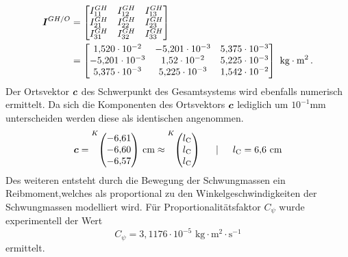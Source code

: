 \begin{equation}
\begin{split}
\boldsymbol{I}^{GH/O} &= \begin{bmatrix}
I^{GH}_{\text{11}} & I^{GH}_{\text{12}} & I^{GH}_{\text{13}} \\
I^{GH}_{\text{21}} & I^{GH}_{\text{22}} & I^{GH}_{\text{23}} \\
I^{GH}_{\text{31}} & I^{GH}_{\text{32}} & I^{GH}_{\text{33}}
\end{bmatrix} \\
&=
\begin{bmatrix}
1{,}520\cdot 10^{-2} & -5{,}201\cdot 10^{-3} & 5{,}375\cdot 10^{-3} \\
-5{,}201\cdot 10^{-3} & 1{,}52\cdot 10^{-2} & 5{,}225\cdot 10^{-3} \\
5{,}375\cdot 10^{-3} & 5{,}225\cdot 10^{-3} & 1{,}542\cdot 10^{-2}
\end{bmatrix}\text{ kg}\cdot \text{m}^2 \,.
\end{split}
\end{equation}
Der Ortsvektor $\boldsymbol{c}$ des Schwerpunkt des Gesamtsystems wird ebenfalls numerisch ermittelt. Da sich die Komponenten des Ortsvektors $\boldsymbol{c}$ lediglich um $10^{-1}\text{mm}$ unterscheiden werden diese als identischen angenommen.
\begin{equation}
\bs{c} = \vecBS{K}{-6{,}61}{-6{,}60}{-6{,}57}\text{ cm} \approx \vecBS{K}{l\idx{C}}{l\idx{C}}{l\idx{C}} \hspace{15pt} \vert \hspace{15pt} l\idx{C} = 6{,}6\text{ cm}
\end{equation}
Des weiteren entsteht durch die Bewegung der Schwungmassen ein Reibmoment,welches als proportional zu den Winkelgeschwindigkeiten der Schwungmassen modelliert wird. Für Proportionalitätsfaktor $C_{\psi}$ wurde experimentell der  Wert 
\begin{equation}
C_{\psi} = 3{,}1176\cdot 10^{-5}\text{ kg}\cdot \text{m}^2 \cdot \text{s}^{-1}
\end{equation}
ermittelt.